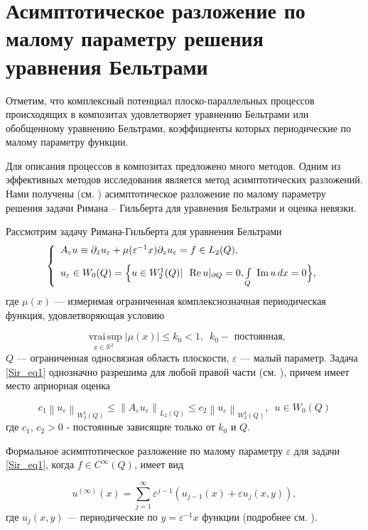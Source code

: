 \chapter{Асимптотическое разложение по малому параметру решения уравнения Бельтрами}
Отметим, что комплексный потенциал плоско-параллельных процессов происходящих в композитах удовлетворяет
уравнению Бельтрами или обобщенному уравнению Бельтрами, коэффициенты которых периодические по малому
параметру функции.



Для описания процессов в композитах предложено много методов. Одним из эффективных методов исследования
является метод асимптотических разложений. 
Нами получены (см. \cite{sir1})
асимптотическое разложение по малому параметру решения задачи Римана -- Гильберта для уравнения Бельтрами и оценка невязки.

Рассмотрим задачу Римана-Гильберта для уравнения Бельтрами
\begin{equation}\label{Sir_eq1}
\left\{\begin{array}{l}
 A_{\varepsilon} u\equiv \partial_{\bar{z}}u_{\varepsilon}+\mu(\varepsilon^{-1}x) \partial_z u_{\varepsilon}=
 f\in L_2(Q),  \\[8pt]
 u_\varepsilon \in W_0(Q)=\Big\{u\in W^1_2(Q)|\,\,\textrm{ Re\,}u|_{\partial Q}=0, \int\limits_{Q}\textrm{ Im\,}u\, dx=0\Big\},
\end{array}\right.
\end{equation}
где $\mu (x)$ --- измеримая ограниченная комплекснозначная периодическая функция,  удовлетворяющая условию

$$
\underset{x\in\mathbb{R}^2}{\textrm{ vrai}\, \sup}\left|\mu (x)\right|\leqslant k_0 <1, \,\,\, k_0 -
\textrm{ постоянная},
$$
$Q$ --- ограниченная односвязная область плоскости, $\varepsilon$ --- малый параметр.
Задача \eqref{Sir_eq1} однозначно разрешима для любой правой части (см. \cite{sir2}), причем имеет место априорная оценка

$$
c_1 \left\| u_{\varepsilon}\right\|_{W^{1}_{2}(Q)}\leqslant \left\| A_{\varepsilon} u_{\varepsilon}
\right\|_{L_2(Q)}\leqslant c_2 \left\| u_{\varepsilon}\right\|_{W^{1}_{2}(Q)}, \,\,\,
u\in W_0 (Q)
$$
где $c_1$, $c_2>0$ - постоянные зависящие только от $k_0$ и $Q$.

Формальное асимптотическое разложение по малому параметру $\varepsilon$ для задачи \eqref{Sir_eq1},
когда $f\in C^{\infty}(Q)$, имеет вид

\begin{equation}\label{Sir_eq2}
u^{(\infty)}(x)=\sum^{\infty}_{j=1}\varepsilon^{j-1}\left(u_{j-1} (x)+\varepsilon u_j(x,y)\right),
\end{equation}
где $u_j(x,y)$ --- периодические по $y= \varepsilon^{-1}x$ функции (подробнее см. \cite{sir1}).

